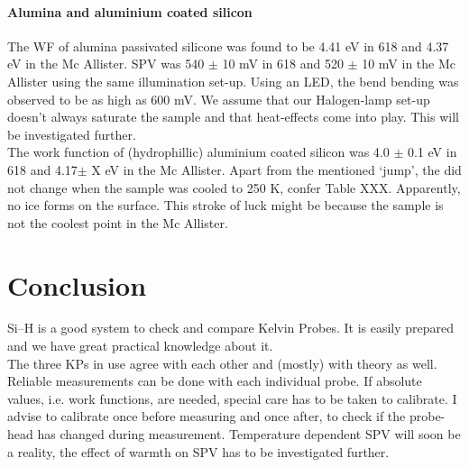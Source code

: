 \documentclass[a4paper,10pt]{article}
\newcommand{\sih}{Si--H}
\newcommand{\cpd}{\text{CPD}}
\newcommand{\McA}{Mc Allister}
\newcommand{\kp}{KP}
\newcommand{\spv}{SPV}
\newcommand{\ie}{i.e.}
\newcommand{\wf}{WF}
\begin{document}
\paragraph{Alumina and aluminium coated silicon}
The \wf{} of alumina passivated silicone was found to be 4.41 eV in 618 and 4.37 eV in the \McA{}. \spv{} was 540 $\pm$ 10 mV in 618 and 520 $\pm$ 10 mV in the \McA{} using the same illumination set-up. Using an LED, the bend bending was observed to be as high as 600 mV. We assume that our Halogen-lamp set-up doesn't always saturate the sample and that heat-effects come into play. This will be investigated further.\\
The work function of  (hydrophillic) aluminium coated silicon was 4.0 $\pm$ 0.1 eV in 618 and 4.17$\pm$ X eV in the \McA{}. Apart from the mentioned \lq{}jump\rq{}, the \cpd{} did not change when the sample was cooled to 250 K, confer Table XXX. Apparently, no ice forms on the surface. This stroke of luck might be because the sample is not the coolest point in the \McA{}.

\section{Conclusion}
\sih{} is a good system to check and compare Kelvin Probes. It is easily prepared and we have great practical knowledge about it.\\
The three \kp{}s in use agree with each other and (mostly) with theory as well. Reliable measurements can be done with each individual probe. If absolute values, \ie{} work functions, are needed, special care has to be taken to calibrate. I advise to calibrate once before measuring and once after, to check if the probe-head has changed during measurement. Temperature dependent \spv{} will soon be a reality, the effect of warmth on \spv{} has to be investigated further.
\end{document}
